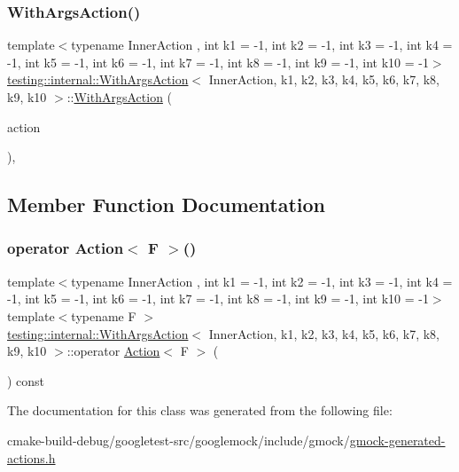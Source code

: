 \subsubsection{\texorpdfstring{WithArgsAction()}{WithArgsAction()}}
{\footnotesize\ttfamily template$<$typename Inner\+Action , int k1 = -\/1, int k2 = -\/1, int k3 = -\/1, int k4 = -\/1, int k5 = -\/1, int k6 = -\/1, int k7 = -\/1, int k8 = -\/1, int k9 = -\/1, int k10 = -\/1$>$ \\
\mbox{\hyperlink{classtesting_1_1internal_1_1WithArgsAction}{testing\+::internal\+::\+With\+Args\+Action}}$<$ Inner\+Action, k1, k2, k3, k4, k5, k6, k7, k8, k9, k10 $>$\+::\mbox{\hyperlink{classtesting_1_1internal_1_1WithArgsAction}{With\+Args\+Action}} (\begin{DoxyParamCaption}\item[{const Inner\+Action \&}]{action }\end{DoxyParamCaption})\hspace{0.3cm}{\ttfamily [inline]}, {\ttfamily [explicit]}}



\subsection{Member Function Documentation}
\mbox{\label{classtesting_1_1internal_1_1WithArgsAction_ab6d8f89fd5a54f2914da2523b2ba6ee5}} 
\subsubsection{\texorpdfstring{operator Action$<$ F $>$()}{operator Action< F >()}}
{\footnotesize\ttfamily template$<$typename Inner\+Action , int k1 = -\/1, int k2 = -\/1, int k3 = -\/1, int k4 = -\/1, int k5 = -\/1, int k6 = -\/1, int k7 = -\/1, int k8 = -\/1, int k9 = -\/1, int k10 = -\/1$>$ \\
template$<$typename F $>$ \\
\mbox{\hyperlink{classtesting_1_1internal_1_1WithArgsAction}{testing\+::internal\+::\+With\+Args\+Action}}$<$ Inner\+Action, k1, k2, k3, k4, k5, k6, k7, k8, k9, k10 $>$\+::operator \mbox{\hyperlink{classtesting_1_1Action}{Action}}$<$ F $>$ (\begin{DoxyParamCaption}{ }\end{DoxyParamCaption}) const\hspace{0.3cm}{\ttfamily [inline]}}



The documentation for this class was generated from the following file\+:\begin{DoxyCompactItemize}
\item 
cmake-\/build-\/debug/googletest-\/src/googlemock/include/gmock/\mbox{\hyperlink{gmock-generated-actions_8h}{gmock-\/generated-\/actions.\+h}}\end{DoxyCompactItemize}
